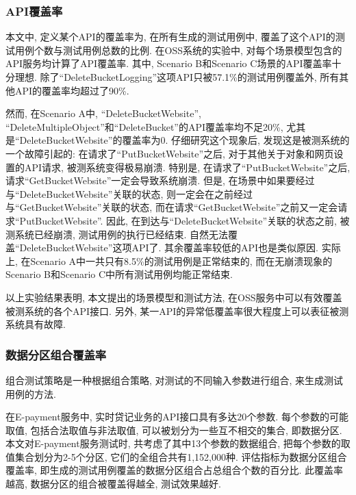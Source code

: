             \subsubsection*{API覆盖率}
            
                本文中, 定义某个API的覆盖率为, 在所有生成的测试用例中, 覆盖了这个API的测试用例个数与测试用例总数的比例. 在OSS系统的实验中, 对每个场景模型包含的API服务均计算了API覆盖率. 其中, Scenario B和Scenario C场景的API覆盖率十分理想. 除了“DeleteBucketLogging”这项API只被57.1\%的测试用例覆盖外, 所有其他API的覆盖率均超过了90\%.
                
                然而, 在Scenario A中, “DeleteBucketWebsite”, “DeleteMultipleObject”和“DeleteBucket”的API覆盖率均不足20\%, 尤其是“DeleteBucketWebsite”的覆盖率为0. 仔细研究这个现象后, 发现这是被测系统的一个故障引起的: 在请求了“PutBucketWebsite”之后, 对于其他关于对象和网页设置的API请求, 被测系统变得极易崩溃. 特别是, 在请求了“PutBucketWebsite”之后, 请求“GetBucketWebsite”一定会导致系统崩溃. 但是, 在场景中如果要经过与“DeleteBucketWebsite”关联的状态, 则一定会在之前经过与“GetBucketWebsite”关联的状态, 而在请求“GetBucketWebsite”之前又一定会请求“PutBucketWebsite”. 因此, 在到达与“DeleteBucketWebsite”关联的状态之前, 被测系统已经崩溃, 测试用例的执行已经结束. 自然无法覆盖“DeleteBucketWebsite”这项API了. 其余覆盖率较低的API也是类似原因. 实际上, 在Scenario A中一共只有8.5\%的测试用例是正常结束的, 而在无崩溃现象的Scenario B和Scenario C中所有测试用例均能正常结束.
                
                以上实验结果表明, 本文提出的场景模型和测试方法, 在OSS服务中可以有效覆盖被测系统的各个API接口. 另外, 某一API的异常低覆盖率很大程度上可以表征被测系统具有故障.
            
            \subsubsection*{数据分区组合覆盖率}
            
                \label{sec:partition}
                
                组合测试策略\cite{grindal2005combination}是一种根据组合策略, 对测试的不同输入参数进行组合, 来生成测试用例的方法.
                
                在E-payment服务中, 实时贷记业务的API接口具有多达20个参数. 每个参数的可能取值, 包括合法取值与非法取值, 可以被划分为一些互不相交的集合, 即数据分区. 本文对E-payment服务测试时, 共考虑了其中13个参数的数据组合, 把每个参数的取值集合划分为2-5个分区,  它们的全组合共有1,152,000种. 评估指标为数据分区组合覆盖率, 即生成的测试用例覆盖的数据分区组合占总组合个数的百分比. 此覆盖率越高, 数据分区的组合被覆盖得越全, 测试效果越好. 
                
